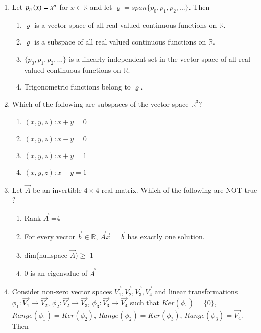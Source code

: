 \begin{enumerate}[label=\thesection.\arabic*.,ref=\thesection.\theenumi]
\begin{enumerate}
\end{enumerate}
%
\solution

\item Let $p_n\left(x\right)=x^n$ for $x\in\mathbb{R}$ and let $\varrho=span\{p_0,p_1,p_2,...\}$. Then
\begin{enumerate}
    \item $\varrho$ is a vector space of all real valued continuous functions on $\mathbb{R}$.
    \item $\varrho$ is a subspace of all real valued continuous functions on $\mathbb{R}$.
    \item $\{p_0,p_1,p_2,...\}$ is a linearly independent set in the vector space of all real valued continuous functions on $\mathbb{R}$.
    \item Trigonometric functions belong to $\varrho$.
\end{enumerate}
%
%
\solution

\item Which of the following are subspaces of the vector space $\mathbb{R}^3$?
\begin{enumerate}
  \item ${(x, y, z):x + y = 0}$
  \item ${(x, y, z):x - y = 0}$
  \item ${(x, y, z):x + y = 1}$
  \item ${(x, y, z):x - y = 1}$
\end{enumerate}
%
%
\solution


\item Let $\vec{A}$ be an invertible $4 \times 4$ real matrix. Which of the following are NOT true ? 
\begin{enumerate}
\item  Rank $\vec{A}$ =4
\item For every vector $\vec{b} \in \mathbb{R}$, $\vec{A}\vec{x}=\vec{b}$ has exactly one solution. 
\item dim(nullspace $\vec{A}$)$\geq$ 1
\item 0 is an eigenvalue of $\vec{A}$
\end{enumerate}
%
\solution

\item 	Consider non-zero vector spaces $\vec{V_1}, \vec{V_2}, \vec{V_3}, \vec{V_4}$ and linear transformations $\phi_1 : \vec{V_1} \rightarrow \vec{V_2}$, $\phi_2 : \vec{V_2} \rightarrow \vec{V_3}$, $\phi_3 : \vec{V_3} \rightarrow \vec{V_4}$ such that $Ker(\phi_1) = \{0\}$, $Range(\phi_1) = Ker(\phi_2)$, $Range(\phi_2) = Ker(\phi_3)$, $Range(\phi_3) = \vec{V_4}$. Then \\
	

\end{enumerate}
